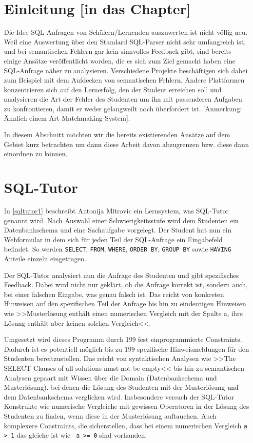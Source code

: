 \section{Einleitung [in das Chapter]}

Die Idee SQL-Anfragen von Schülern/Lernenden auszuwerten ist nicht völlig neu. Weil eine Auswertung über den Standard SQL-Parser nicht sehr umfangreich ist, und bei semantischen Fehlern gar kein sinnvolles Feedback gibt, sind bereits einige Ansätze veröffentlicht worden, die es sich zum Ziel gemacht haben eine SQL-Anfrage näher zu analysieren. Verschiedene Projekte beschäftigen sich dabei zum Beispiel mit dem Aufdecken von semantischen Fehlern. Andere Plattformen konzentrieren sich auf den Lernerfolg, den der Student erreichen soll und analysieren die Art der Fehler des Studenten um ihn mit passenderen Aufgaben zu konfrontieren, damit er weder gelangweilt noch überfordert ist. [Anmerkung: Ähnlich einem Art Matchmaking System].

In diesem Abschnitt möchten wir die bereits existierenden Ansätze auf dem Gebiet kurz betrachten um dann diese Arbeit davon abzugrenzen bzw. diese dann einordnen zu können.

\section{SQL-Tutor}

In \ref{sqltutor1} beschreibt Antonija Mitrovic ein Lernsystem, was SQL-Tutor genannt wird. Nach Auswahl einer Schwierigkeitsstufe wird dem Studenten ein Datenbankschema und eine Sachaufgabe vorgelegt. Der Student hat nun ein Webformular in dem sich für jeden Teil der SQL-Anfrage ein Eingabefeld befindet. So werden \verb|SELECT|, \verb|FROM|, \verb|WHERE|, \verb|ORDER BY|, \verb|GROUP BY| sowie \verb|HAVING| Anteile einzeln eingetragen.

Der SQL-Tutor analysiert nun die Anfrage des Studenten und gibt spezifisches Feedback. Dabei wird nicht nur geklärt, ob die Anfrage korrekt ist, sondern auch, bei einer falschen Eingabe, was genau falsch ist. Das reicht von konkreten Hinweisen auf den spezifischen Teil der Anfrage bis hin zu eindeutigen Hinweisen wie >>Musterlösung enthält einen numerischen Vergleich mit der Spalte a, ihre Lösung enthält aber keinen solchen Vergleich<<.

Umgesetzt wird dieses Programm durch 199 fest einprogrammierte Constraints. Dadurch ist es potentiell möglich bis zu 199 spezifische Hinweismeldungen für den Studenten bereitzustellen. Das reicht von syntaktischen Analysen wie >>The SELECT Clauses of all solutions must not be empty<< bis hin zu semantischen Analysen gepaart mit Wissen über die Domain (Datenbankschema und Musterlösung), bei denen die Lösung des Studenten mit der Musterlösung und dem Datenbankschema verglichen wird. Insbesondere versuch der SQL-Tutor Konstrukte wie numerische Vergleiche mit gewissen Operatoren in der Lösung des Studenten zu finden, wenn diese in der Musterlösung auftauchen. Auch komplexere Constraints, die sicherstellen, dass bei einem numerischen Vergleich \verb|a > 1| das gleiche ist wie \verb| a >= 0| sind vorhanden. 

